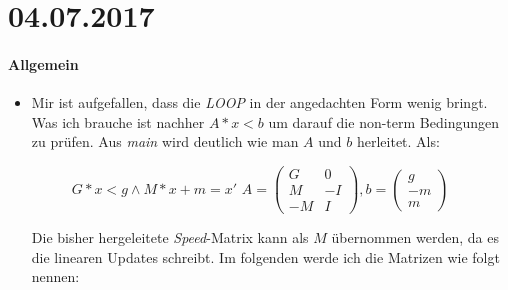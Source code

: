 \section*{04.07.2017}

\paragraph{Allgemein}
\begin{itemize}
	\item Mir ist aufgefallen, dass die \emph{LOOP} in der angedachten Form wenig bringt. Was ich brauche ist nachher $A*x<b$ um darauf die non-term Bedingungen zu prüfen. Aus \emph{main} wird deutlich wie man $A$ und $b$ herleitet. Als: 
		\begin{figure}[H]
			\centering
			$G*x<g \land M*x+m=x'$ \newline
			$A = 
				\begin{pmatrix} 
					G &  0 \\ 
					M & -I \\
					-M & I 
				\end{pmatrix}, b = \begin{pmatrix}
					g \\
					-m \\
					m
				\end{pmatrix}$
		\end{figure}
		Die bisher hergeleitete \emph{Speed}-Matrix kann als $M$ übernommen werden, da es die linearen Updates schreibt. Im folgenden werde ich die Matrizen wie folgt nennen:
		\begin{figure}[H]
			\centering
			\begin{minipage}{0.4\textwidth}
			\end{minipage}
			\begin{minipage}{0.4\textwidth}
			\end{minipage}

\end{figure}
\end{itemize}
